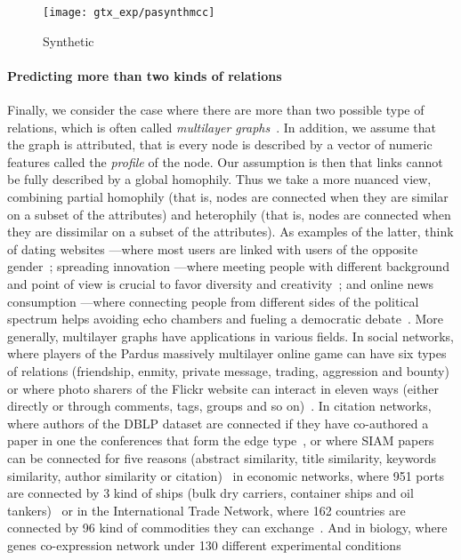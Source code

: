 \begin{figure}[phtb]
  \centering
  \texttt{[image: gtx\_exp/pasynthmcc]}
  \caption{Synthetic \lpa{} }\label{fig:gtx_xp_pasynthmcc}
\end{figure}

\vspace{-\baselineskip}
\paragraph{Predicting more than two kinds of relations}

Finally, we consider the case where there are more than two possible type of relations, which is
often called \emph{multilayer graphs}~\autocites{Kivela2014}{multiSurvey14}. In addition, we assume
that the graph is attributed, that is every node is described by a vector of numeric features called
the \emph{profile} of the node. Our assumption is then that links cannot be fully described by a
global homophily. Thus we take a more nuanced view, combining partial homophily (that is, nodes are
connected when they are similar on a subset of the attributes) and heterophily (that is, nodes are
connected when they are dissimilar on a subset of the attributes). As examples of the latter, think
of dating websites ---where most users are linked with users of the opposite
gender~\autocites{homophilyMyspace09}{Tinder16}; spreading innovation ---where meeting people with
different background and point of view is crucial to favor diversity and
creativity~\autocite{rogers2003diffusion}; and online news consumption ---where connecting people
from different sides of the political spectrum helps avoiding echo chambers and fueling a democratic
debate~\autocite{balancedNews17}. More generally, multilayer graphs have applications in various
fields. In social networks, where players of the Pardus massively multilayer online game can have
six types of relations (friendship, enmity, private message, trading, aggression and
bounty)~\autocite{Szell2010} or where photo sharers of the Flickr website can interact in eleven
ways (either directly or through comments, tags, groups and so on)~\autocite{RecoFlickrMulti11}. In
citation networks, where authors of the DBLP dataset are connected if they have co-authored a paper
in one the  conferences that form the edge type~\autocite{communityDBLPbyConf05}, or where
 SIAM papers can be connected for five reasons (abstract similarity, title similarity,
keywords similarity, author similarity or citation)~\autocite{articlesMultiSim11} in economic
networks, where 951 ports are connected by 3 kind of ships (bulk dry carriers, container ships and
oil tankers)~\autocite{ports3kindofships10} or in the International Trade Network, where 162
countries are connected by 96 kind of commodities they can exchange~\autocite{worldTradeNetwork10}.
And in biology, where genes co-expression network under 130 different experimental
conditions~\autocite{bioLayerExp11}

